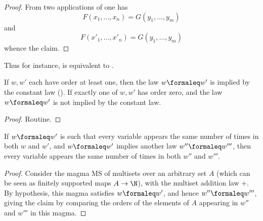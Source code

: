 \begin{proof}
  From two applications of  one has
  $$ F(x_1,\dots,x_n) = G(y_1,\dots,y_m)$$
  and
  $$ F(x'_1,\dots,x'_n) = G(y_1,\dots,y_m)$$
  whence the claim.
\end{proof}

Thus for instance,  is equivalent to .

\begin{theorem}\label{constant-impl}
  If $w, w'$ each have order at least one, then the law $w \formaleq w'$ is implied by the constant law (). If exactly one of $w, w'$ has order zero, and the law $w \formaleq w'$ is not implied by the constant law.
\end{theorem}

\begin{proof}
  Routine.
\end{proof}

\begin{theorem}\label{variable-impl}\leanok
  If $w \formaleq w'$ is such that every variable appears the same number of times in both $w$ and $w'$, and $w \formaleq w'$ implies another law $w'' \formaleq w'''$, then every variable appears the same number of times in both $w''$ and $w'''$.
\end{theorem}

\begin{proof}
  Consider the magma $\mathrm{MS}$ of multisets over an arbitrary set $A$ (which can be seen as finitely supported maps $A\rightarrow \N$), with the multiset addition law $+$. By hypothesis, this magma satisfies $w \formaleq w'$, and hence $w'' \formaleq w'''$, giving the claim by comparing the orders of the elements of $A$ appearing in $w''$ and $w'''$ in this magma.
\end{proof}
